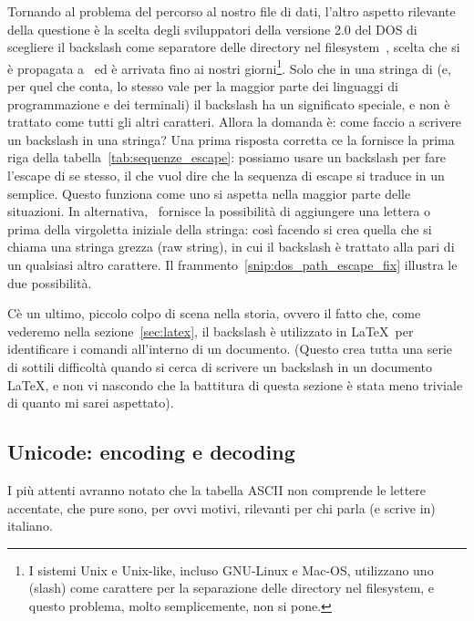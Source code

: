 Tornando al problema del percorso al nostro file di dati, l'altro aspetto rilevante
della questione \`e la scelta degli sviluppatori della versione 2.0 del DOS di scegliere
il backslash come separatore delle directory nel filesystem~\cite{dos_backslash},
scelta che si \`e propagata a \windows\ ed \`e arrivata fino ai nostri giorni\footnote{
I sistemi Unix e Unix-like, incluso GNU-Linux e Mac-OS, utilizzano uno \cchar{/}
(slash) come carattere per la separazione delle directory nel filesystem, e questo
problema, molto semplicemente, non si pone.}.
Solo che in una stringa di \python (e, per quel che conta, lo stesso vale per la
maggior parte dei linguaggi di programmazione e dei terminali) il backslash ha un
significato speciale, e non \`e trattato come tutti gli altri caratteri. Allora la
domanda \`e: come faccio a scrivere un backslash in una stringa? Una prima risposta
corretta ce la fornisce la prima riga della tabella~\ref{tab:sequenze_escape}: possiamo
usare un backslash per fare l'escape di se stesso, il che vuol dire che la sequenza
di escape \cchar{\textbackslash{}\textbackslash} si traduce in un \cchar{\textbackslash{}}
semplice. Questo funziona come uno si aspetta nella maggior parte delle situazioni.
In alternativa, \python\ fornisce la possibilit\`a di aggiungere una lettera 
o  prima della virgoletta iniziale della stringa: cos\`i facendo si crea
quella che si chiama una stringa grezza (raw string), in cui il backslash \`e trattato
alla pari di un qualsiasi altro carattere. Il frammento~\ref{snip:dos_path_escape_fix}
illustra le due possibilit\`a.


C\`e un ultimo, piccolo colpo di scena nella storia, ovvero il fatto che, come vederemo
nella sezione~\ref{sec:latex}, il backslash \`e utilizzato in \LaTeX\ per identificare
i comandi all'interno di un documento. (Questo crea tutta una serie di sottili difficolt\`a
quando si cerca di scrivere un backslash in un documento \LaTeX, e non vi nascondo
che la battitura di questa sezione \`e stata meno triviale di quanto mi sarei aspettato).


\subsection{Unicode: encoding e decoding}

I pi\`u attenti avranno notato che la tabella ASCII non comprende le lettere accentate,
che pure sono, per ovvi motivi, rilevanti per chi parla (e scrive in) italiano.

